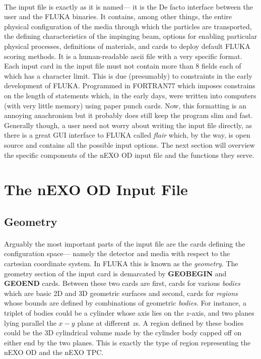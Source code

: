 \documentclass[10pt]{article}
\begin{document}
    \paragraph{}
    The input file is exactly as it is named— it is the De facto interface between the user and the FLUKA binaries. It contains, among other things, the entire physical configuration of the media through which the particles are transported, the defining characteristics of the impinging beam, options for enabling particular physical processes, definitions of materials, and cards to deploy default FLUKA scoring methods. It is a human-readable ascii file with a very specific format. Each input card in the input file must not contain more than 8 fields each of which has a character limit. This is due (presumably) to constraints in the early development of FLUKA. Programmed in FORTRAN77 which imposes constrains on the length of statements which, in the early days, were written into computers (with very little memory) using paper punch cards. Now, this formatting is an annoying anachronism but it probably does still keep the program slim and fast. Generally though, a user need not worry about writing the input file directly, as there is a great GUI interface to FLUKA called \textit{flair} which, by the way, is open source and contains all the possible input options. The next section will overview the specific components of the nEXO OD input file and the functions they serve.


\section{The nEXO OD Input File}

\subsection{Geometry}
\paragraph{}
Arguably the most important parts of the input file are the cards defining the configuration space— namely the detector and media with respect to the cartesian coordinate system. In FLUKA this is known as the \textit{geometry}. The geometry section of the input card is demarcated by \textbf{GEOBEGIN} and \textbf{GEOEND} cards. Between these two cards are first, cards for various \textit{bodies} which are basic 2D and 3D geometric surfaces and second, cards for \textit{regions} whose bounds are defined by combinations of geometric \textit{bodies}. For instance, a triplet of bodies could be a cylinder whose axis lies on the $z$-axis, and two planes lying parallel the $x-y$ plane at different $z$s. A region defined by these bodies could be the 3D cylindrical volume made by the cylinder body capped off on either end by the two planes. This is exactly the type of region representing the nEXO OD and the nEXO TPC. 
\end{document}
